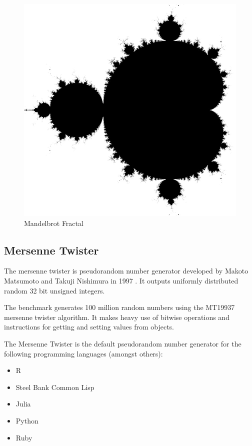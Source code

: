 \documentclass[english,a4paper,12pt]{report}
\begin{document}
\begin{figure}
  \centering
  \includegraphics[scale=0.3]{mandelbrot.jpg}
  \caption{Mandelbrot Fractal}
  \label{fig:mandel}
\end{figure}


\subsection{Mersenne Twister}
The mersenne twister is pseudorandom number generator developed by
Makoto Matsumoto and Takuji Nishimura in 1997 \cite{Matsumoto}. It
outputs uniformly distributed random 32 bit unsigned integers.

The benchmark generates 100 million random numbers using the MT19937
mersenne twister algorithm. It makes heavy use of bitwise operations
and instructions for getting and setting values from objects.

The Mersenne Twister is the default pseudorandom number generator for
the following programming languages (amongst others):
\begin{itemize}
	\item R \cite{R}
	\item Steel Bank Common Lisp \cite{SBCL}
	\item Julia \cite{Julia}
	\item Python \cite{Python}
	\item Ruby \cite{Ruby}
\end{itemize}
\end{document}
